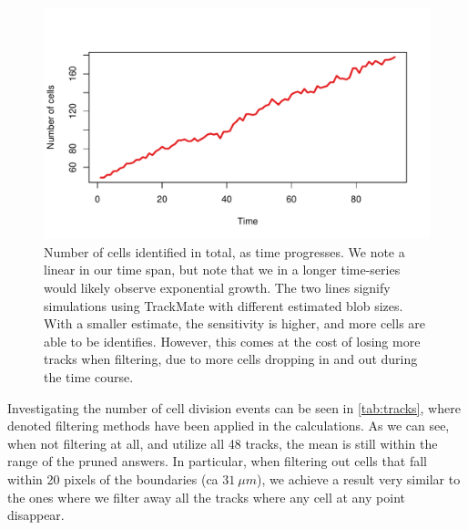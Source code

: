 \documentclass[10pt]{article}
\makeatletter
\def\maxwidth{ %
  \ifdim\Gin@nat@width>\linewidth
    \linewidth
  \else
    \Gin@nat@width
  \fi
}
\theoremstyle{plain}
\makeatother
\begin{document}
\begin{multicols*}{2}
\begin{multicols}{2}
\begin{Schunk}
\begin{figure}[H]

{\centering \includegraphics[width=\maxwidth]{figure/twocolumn-2_cells_per_time-1} 

}

\caption[Number of cells identified in total, as time progresses]{Number of cells identified in total, as time progresses. We note a linear in our time span, but note that we in a longer time-series would likely observe exponential growth. The two lines signify simulations using TrackMate with different estimated blob sizes. With a smaller estimate, the sensitivity is higher, and more cells are able to be identifies. However, this comes at the cost of losing more tracks when filtering, due to more cells dropping in and out during the time course.}\label{fig:2_cells_per_time}
\end{figure}
\end{Schunk}




Investigating the number of cell division events can be seen in \cref{tab:tracks}, where denoted filtering methods have been applied in the calculations. As we can see, when not filtering at all, and utilize all 48 tracks, the mean is still within the range of the pruned answers. In particular, when filtering out cells that fall within 20 pixels of the boundaries (ca $31~\mu m$), we achieve a result very similar to the ones where we filter away all the tracks where any cell at any point disappear.


\end{multicols}
\end{multicols*}
\end{document}
